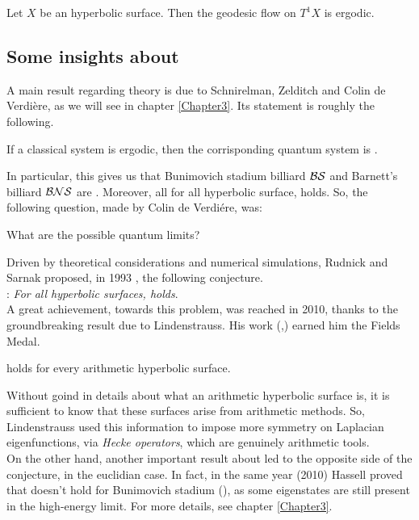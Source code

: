 \begin{nteo}[Hopf]
\label{teo:Hopf_theorem}
Let $X$ be an hyperbolic surface. Then the geodesic flow on $T^{1}X$ is ergodic.
\end{nteo} 


\subsection{Some insights about \QUE}


A main result regarding \QE theory is due to Schnirelman,
Zelditch and Colin de Verdière, as we will see in chapter \ref{Chapter3}. Its statement is roughly the following.

\begin{nteo}
\label{teo:preview_quantum_ergod_theorem}
If a classical system is ergodic, then the corrisponding quantum system is \QE.
\end{nteo}

In particular, this gives us that Bunimovich stadium billiard $\operatorname{\mathcal{BS}}$ and Barnett's billiard $\operatorname{\mathcal{BNS}}$ are \QE. Moreover, all for all hyperbolic surface, \QE holds. So, the following question, made by Colin de Verdiére, was:
\begin{center}
What are the possible quantum limits?
\end{center}
Driven by theoretical considerations and numerical simulations, Rudnick and Sarnak proposed, in 1993 \cite{RudSarn:conj}, the following conjecture.\\[2mm]
\noindent{}: \emph{For all hyperbolic surfaces, \QUE holds}.\\[2mm]
A great achievement, towards this problem, was reached in 2010, thanks to the groundbreaking result due to Lindenstrauss. His work (\cite{LindBourg:entropy},\cite{Linden:main_art}) earned him the Fields Medal.

\begin{teo}
\QUE holds for every arithmetic hyperbolic surface. 
\end{teo} 

Without goind in details about what an arithmetic hyperbolic surface is, it is sufficient to know that these surfaces arise from arithmetic methods. So, Lindenstrauss used this information to impose more symmetry on Laplacian eigenfunctions, via \emph{Hecke operators}, which are genuinely arithmetic tools.\\
On the other hand, another important result about \QUE led to the opposite side of the conjecture, in the euclidian case. In fact, in the same year (2010) Hassell proved that \QUE doesn't hold for Bunimovich stadium (\cite{Hass:billiards_not}), as some  eigenstates are still present in the high-energy limit. For more details, see chapter \ref{Chapter3}.


